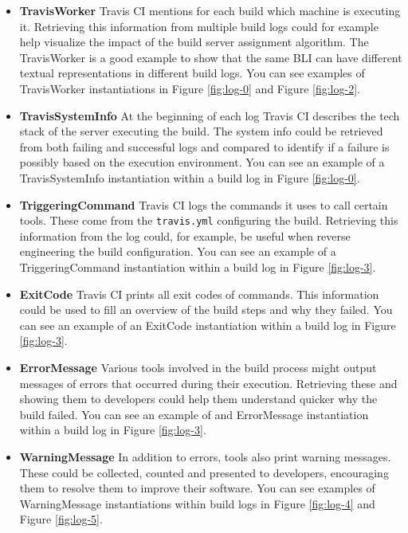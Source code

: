\documentclass[\myrootdir/main.tex]{subfiles}
\begin{document}
\begin{itemize}
	\item \textbf{TravisWorker} Travis CI mentions for each build which machine is executing it.
	      Retrieving this information from multiple build logs could for example help visualize the impact of the build server assignment algorithm.
	      The TravisWorker is a good example to show that the same BLI can have different textual representations in different build logs.
	      You can see examples of TravisWorker instantiations in Figure \ref{fig:log-0} and Figure \ref{fig:log-2}.

	\item \textbf{TravisSystemInfo} At the beginning of each log Travis CI describes the tech stack of the server executing the build.
	      The system info could be retrieved from both failing and successful logs and compared to identify if a failure is possibly based on the execution environment.
	      You can see an example of a TravisSystemInfo instantiation within a build log in Figure \ref{fig:log-0}.

	\item \textbf{TriggeringCommand} Travis CI logs the commands it uses to call certain tools.
	      These come from the \texttt{travis.yml} configuring the build.
	      Retrieving this information from the log could, for example, be useful when reverse engineering the build configuration.
	      You can see an example of a TriggeringCommand instantiation within a build log in Figure \ref{fig:log-3}.

	\item \textbf{ExitCode} Travis CI prints all exit codes of commands.
	      This information could be used to fill an overview of the build steps and why they failed.
	      You can see an example of an ExitCode instantiation within a build log in Figure \ref{fig:log-3}.

	\item \textbf{ErrorMessage} Various tools involved in the build process might output messages of errors that occurred during their execution.
	      Retrieving these and showing them to developers could help them understand quicker why the build failed.
	      You can see an example of and ErrorMessage instantiation within a build log in Figure \ref{fig:log-3}.

	\item \textbf{WarningMessage} In addition to errors, tools also print warning messages.
	      These could be collected, counted and presented to developers, encouraging them to resolve them to improve their software.
	      You can see examples of WarningMessage instantiations within build logs in Figure \ref{fig:log-4} and Figure \ref{fig:log-5}.

\end{itemize}
\end{document}
